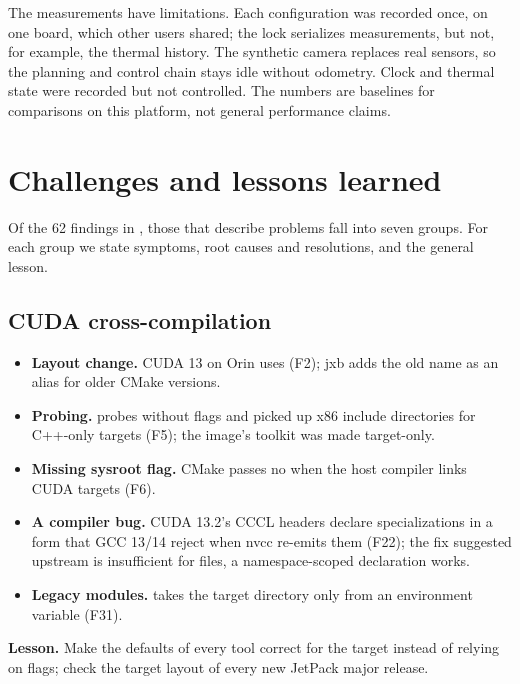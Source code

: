 \documentclass[11pt,a4paper]{article}
\newcommand{\jxb}{\textsf{jxb}}
\newcommand{\finding}[1]{\textsf{\small F#1}}
\begin{document}
The measurements have limitations. Each configuration was recorded once, on one board, which other users shared; the
lock serializes measurements, but not, for example, the thermal history. The synthetic camera replaces real sensors,
so the planning and control chain stays idle without odometry. Clock and thermal state were recorded but not
controlled. The numbers are baselines for comparisons on this platform, not general performance claims.

\section{Challenges and lessons learned}\label{sec:challenges}
Of the 62 findings in , those that describe problems fall into seven groups. For each group we
state symptoms, root causes and resolutions, and the general lesson.

\subsection{CUDA cross-compilation}
\begin{itemize}
  \item \textbf{Layout change.} CUDA 13 on Orin uses  (\finding{2}); \jxb{} adds the old name
        as an alias for older CMake versions.
  \item \textbf{Probing.}  probes  without flags and picked up x86 include directories
        for C++-only targets (\finding{5}); the image's toolkit was made target-only.
  \item \textbf{Missing sysroot flag.} CMake passes no  when the host compiler links CUDA targets
        (\finding{6}).
  \item \textbf{A compiler bug.} CUDA 13.2's CCCL headers declare specializations in a form that GCC 13/14 reject when
        nvcc re-emits them (\finding{22}); the fix suggested upstream is insufficient for  files, a
        namespace-scoped declaration works.
  \item \textbf{Legacy modules.}  takes the target directory only from an environment variable
        (\finding{31}).
\end{itemize}
\begin{lesson}\textbf{Lesson.} Make the defaults of every tool correct for the target instead of relying on flags; check
the target layout of every new JetPack major release.\end{lesson}
\end{document}
